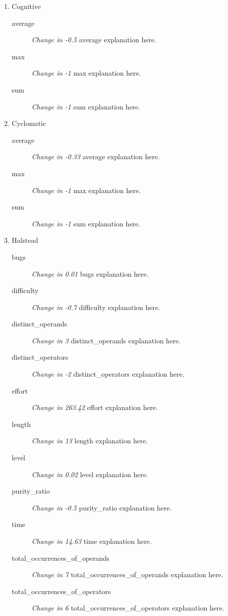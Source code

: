 \begin{enumerate}
  \item Cognitive
        \begin{description}
          \item [average] \textit{Change in -0.5} average explanation here.
          \item [max] \textit{Change in -1} max explanation here.
          \item [sum] \textit{Change in -1} sum explanation here.
        \end{description}
  \item Cyclomatic
        \begin{description}
          \item [average] \textit{Change in -0.33} average explanation here.
          \item [max] \textit{Change in -1} max explanation here.
          \item [sum] \textit{Change in -1} sum explanation here.
        \end{description}
  \item Halstead
        \begin{description}
          \item [bugs] \textit{Change in 0.01} bugs explanation here.
          \item [difficulty] \textit{Change in -0.7} difficulty explanation here.
          \item [distinct\_operands] \textit{Change in 3} distinct\_operands explanation here.
          \item [distinct\_operators] \textit{Change in -2} distinct\_operators explanation here.
          \item [effort] \textit{Change in 263.42} effort explanation here.
          \item [length] \textit{Change in 13} length explanation here.
          \item [level] \textit{Change in 0.02} level explanation here.
          \item [purity\_ratio] \textit{Change in -0.5} purity\_ratio explanation here.
          \item [time] \textit{Change in 14.63} time explanation here.
          \item [total\_occurrences\_of\_operands] \textit{Change in 7} total\_occurrences\_of\_operands explanation here.
          \item [total\_occurrences\_of\_operators] \textit{Change in 6} total\_occurrences\_of\_operators explanation here.

\end{description}
\end{enumerate}
